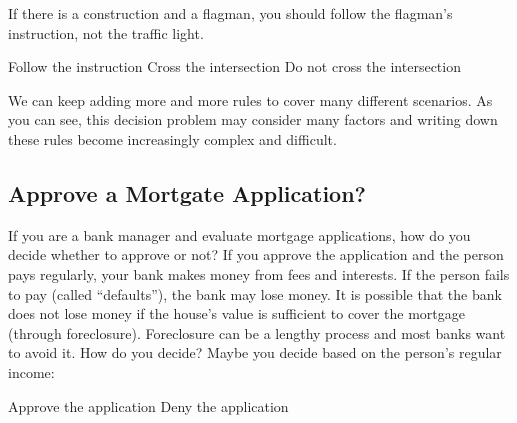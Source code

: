 If there is a construction and a flagman, you should follow the
flagman's instruction, not the traffic light.  

\begin{algorithm}[H]
    \begin{algorithmic}[1]
      \State Follow the instruction
      \Else
      \State Cross the intersection
      \Else
      \State Do not cross the intersection
      \EndIf
      \EndIf
    \end{algorithmic}
\end{algorithm}

We can keep adding more and more rules to cover many different
scenarios.  As you can see, this decision problem may consider many
factors and writing down these rules become increasingly complex and
difficult.

\subsection{Approve a Mortgate Application?}

If you are a bank manager and evaluate mortgage applications, how do
you decide whether to approve or not?  If you approve the application
and the person pays regularly, your bank makes money from fees and
interests.  If the person fails to pay (called ``defaults''), the bank
may lose money. It is possible that the bank does not lose money
if the house's value is sufficient to cover the mortgage (through
foreclosure). Foreclosure can be a lengthy process and most banks want
to avoid it.  How do you decide? Maybe you decide based on the
person's regular income:  


\begin{algorithm}[H]
    \begin{algorithmic}[1]
      \State Approve the application
      \Else
      \State Deny the application
      \EndIf
    \end{algorithmic}
\end{algorithm}

